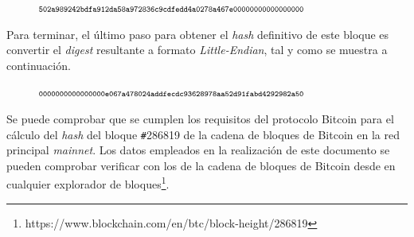 \documentclass{article}
\begin{document}
        \begin{figure}[H]
        \centering
            $\scriptsize{\texttt{502a989242bdfa912da58a972836c9cdfedd4a0278a467e00000000000000000}}$
        \end{figure}
        Para terminar, el último paso para obtener el \textit{hash} definitivo de este bloque es convertir el \textit{digest} resultante a formato \textit{Little-Endian}, tal y como se muestra a continuación.
        \begin{figure}[H]
        \centering
            $\scriptsize{\texttt{0000000000000000e067a478024addfecdc93628978aa52d91fabd4292982a50}}$
        \end{figure}
        Se puede comprobar que se cumplen los requisitos del protocolo Bitcoin para el cálculo del \textit{hash} del bloque \texttt{\#}286819 de la cadena de bloques de Bitcoin en la red principal \textit{mainnet}. Los datos empleados en la realización de este documento se pueden comprobar verificar con los de la cadena de bloques de Bitcoin desde en cualquier explorador de bloques\footnote{https://www.blockchain.com/en/btc/block-height/286819}.
\end{document}
